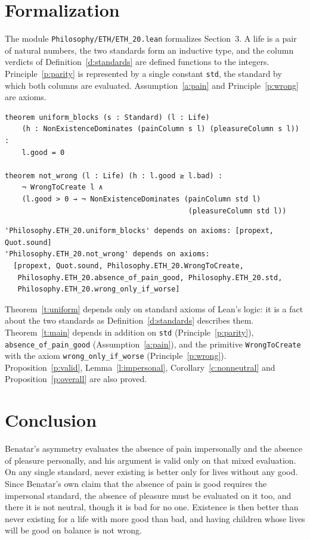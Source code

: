 \documentclass{situationist-preprint}
\begin{document}
\section{Formalization}

The module \nolinkurl{Philosophy/ETH/ETH_20.lean} formalizes Section~3. A life is a pair of natural numbers, the two standards form an inductive type, and the column verdicts of Definition~\ref{d:standards} are defined functions to the integers. Principle~\ref{p:parity} is represented by a single constant \texttt{std}, the standard by which both columns are evaluated. Assumption~\ref{a:pain} and Principle~\ref{p:wrong} are axioms.

\begin{lstlisting}
theorem uniform_blocks (s : Standard) (l : Life)
    (h : NonExistenceDominates (painColumn s l) (pleasureColumn s l)) :
    l.good = 0

theorem not_wrong (l : Life) (h : l.good ≥ l.bad) :
    ¬ WrongToCreate l ∧
    (l.good > 0 → ¬ NonExistenceDominates (painColumn std l)
                                           (pleasureColumn std l))
\end{lstlisting}

\begin{lstlisting}
'Philosophy.ETH_20.uniform_blocks' depends on axioms: [propext, Quot.sound]
'Philosophy.ETH_20.not_wrong' depends on axioms:
  [propext, Quot.sound, Philosophy.ETH_20.WrongToCreate,
   Philosophy.ETH_20.absence_of_pain_good, Philosophy.ETH_20.std,
   Philosophy.ETH_20.wrong_only_if_worse]
\end{lstlisting}

Theorem~\ref{t:uniform} depends only on standard axioms of Lean's logic: it is a fact about the two standards as Definition~\ref{d:standards} describes them. Theorem~\ref{t:main} depends in addition on \texttt{std} (Principle~\ref{p:parity}), \texttt{absence\_of\_pain\_good} (Assumption~\ref{a:pain}), and the primitive \texttt{WrongToCreate} with the axiom \texttt{wrong\_only\_if\_worse} (Principle~\ref{p:wrong}). Proposition~\ref{p:valid}, Lemma~\ref{l:impersonal}, Corollary~\ref{c:nonneutral} and Proposition~\ref{p:overall} are also proved.

\section{Conclusion}

Benatar's asymmetry evaluates the absence of pain impersonally and the absence of pleasure personally, and his argument is valid only on that mixed evaluation. On any single standard, never existing is better only for lives without any good. Since Benatar's own claim that the absence of pain is good requires the impersonal standard, the absence of pleasure must be evaluated on it too, and there it is not neutral, though it is bad for no one. Existence is then better than never existing for a life with more good than bad, and having children whose lives will be good on balance is not wrong.
\end{document}
